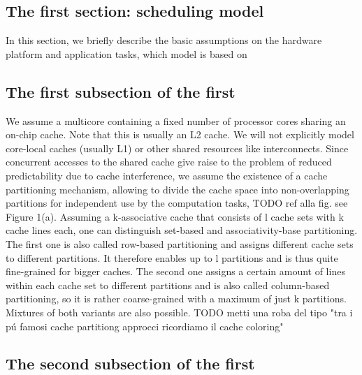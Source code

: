 \documentclass[a4paper,10pt]{article}
\begin{document}
\begin{multicols}{2}
\section{The first section: scheduling model}

In this section, we briefly describe the basic assumptions on the hardware platform and application tasks, which model is based on

\subsection{The first subsection of the first}

We assume a multicore containing a fixed number of processor cores sharing an on-chip cache. Note that this is usually an L2 cache. We 
will not explicitly model core-local caches (usually L1) or other shared resources like interconnects. Since concurrent accesses to the shared 
cache give raise to the problem of reduced predictability due to cache interference, we assume the existence of a cache partitioning 
mechanism, allowing to divide the cache space into non-overlapping partitions for independent use by the computation tasks, TODO ref alla fig.
see Figure 1(a).
Assuming a k-associative cache that consists of l cache sets with k cache lines each, one can distinguish set-based and associativity-base
partitioning. The first one is also called row-based partitioning and assigns different cache sets to different partitions. It therefore enables
up to l partitions and is thus quite fine-grained for bigger caches. The second one assigns a certain amount of lines within each cache set 
to different partitions and is also called column-based partitioning, so it is rather coarse-grained with a maximum of just k partitions. 
Mixtures of both variants are also possible. TODO metti una roba del tipo "tra i p\'u famosi cache partitiong approcci ricordiamo il cache coloring"

\subsection{The second subsection of the first}


\end{multicols}
\end{document}
